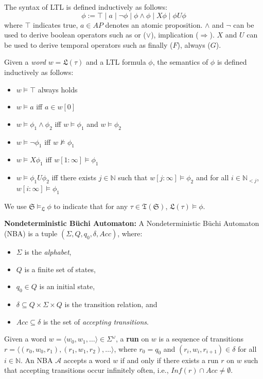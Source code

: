 \documentclass[acmlarge]{acmart}
\begin{document}
The syntax of LTL is defined inductively as follows:
\[
\phi := \top \mid a \mid \lnot \phi \mid \phi \land \phi \mid X \phi \mid \phi U \phi
\]
where $\top$ indicates true, $a \in AP$ denotes an atomic proposition. \(\land\) and \(\lnot\) can be used to derive boolean operators such as or (\(\lor\)), implication (\(\Rightarrow\)). $X$ and $U$ can be used to derive temporal operators such as finally (\(F\)), always (\(G\)).

Given a \emph{word} $w = \mathfrak{L}(\tau)$ and a LTL formula $\phi$, the semantics of $\phi$ is defined inductively as follows:
\begin{itemize}
    \item \(w \models \top \) always holds
    \item \(w \models a\)  iff  \(a \in w[0]\)
    \item \(w \models \phi_1 \land \phi_2\)  iff  \(w \models \phi_1\) and \(w \models \phi_2\)
    \item \(w \models \lnot \phi_1\)  iff  \(w \not\models \phi_1\)
    \item \(w \models X \phi_1\)  iff  \(w[1:\infty] \models \phi_1\)
    \item \(w \models \phi_1 U \phi_2\)  iff  there exists \(j \in \mathbb{N}\) such that \(w[j:\infty] \models \phi_2\) and for all \(i \in \mathbb{N}_{<j}\), \(w[i:\infty] \models \phi_1\)
\end{itemize}

We use $\mathfrak{S} \models_{\mathfrak{L}} \phi$ to indicate that for any $\tau \in \mathfrak{T}(\mathfrak{S})$, $\mathfrak{L}(\tau) \models \phi$.

\textbf{Nondeterministic Büchi Automaton:} A Nondeterministic Büchi Automaton (NBA) is a tuple $(\Sigma, Q, q_0, \delta, Acc)$, where:
\begin{itemize}
  \item $\Sigma$ is the \emph{alphabet},
  \item $Q$ is a finite set of states,
  \item $q_0 \in Q$ is an initial state,
  \item $\delta \subseteq Q \times \Sigma \times Q$ is the transition relation, and
  \item $Acc \subseteq \delta$ is the set of \emph{accepting transitions}.
\end{itemize}
Given a word $w = \langle w_0, w_1, \ldots \rangle \in \Sigma^{\omega}$, a \textbf{run} on $w$ is a sequence of transitions $r = \langle (r_0, w_0, r_1), (r_1, w_1, r_2), \ldots \rangle$, where $r_0 = q_0$ and $(r_i, w_i, r_{i+1}) \in \delta$ for all $i \in \mathbb{N}$. An NBA $\mathcal{A}$ accepts a word $w$ if and only if there exists a run $r$ on $w$ such that accepting transitions occur infinitely often, i.e., $\mathit{Inf}(r) \cap Acc \neq \emptyset$.
\end{document}
